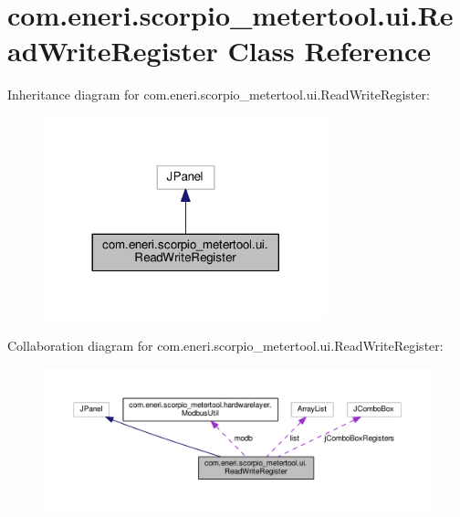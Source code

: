 \hypertarget{classcom_1_1eneri_1_1scorpio__metertool_1_1ui_1_1_read_write_register}{}\section{com.\+eneri.\+scorpio\+\_\+metertool.\+ui.\+Read\+Write\+Register Class Reference}
\label{classcom_1_1eneri_1_1scorpio__metertool_1_1ui_1_1_read_write_register}


Inheritance diagram for com.\+eneri.\+scorpio\+\_\+metertool.\+ui.\+Read\+Write\+Register\+:
\nopagebreak
\begin{figure}[H]
\begin{center}
\leavevmode
\includegraphics[width=233pt]{classcom_1_1eneri_1_1scorpio__metertool_1_1ui_1_1_read_write_register__inherit__graph}
\end{center}
\end{figure}


Collaboration diagram for com.\+eneri.\+scorpio\+\_\+metertool.\+ui.\+Read\+Write\+Register\+:
\nopagebreak
\begin{figure}[H]
\begin{center}
\leavevmode
\includegraphics[width=350pt]{classcom_1_1eneri_1_1scorpio__metertool_1_1ui_1_1_read_write_register__coll__graph}
\end{center}
\end{figure}
